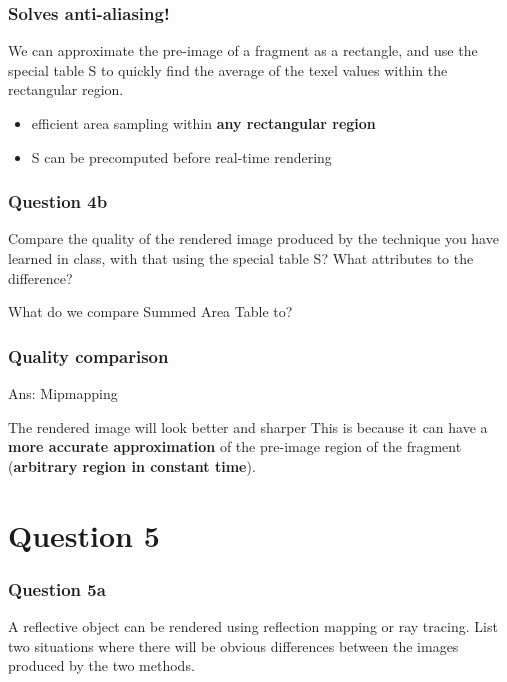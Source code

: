 \documentclass{beamer}
\begin{document}
\begin{frame}
    \frametitle{Solves \textbf{anti-aliasing}!}

    We can approximate the pre-image of a fragment as a rectangle, 
    and use the special table S to quickly find the average of the
    texel values within the rectangular region. 
    
    \begin{itemize}
        \item efficient area sampling within \textbf{any rectangular region}
        \item S can be precomputed before real-time rendering
    \end{itemize}

\end{frame}

\begin{frame}
    \frametitle{Question 4b}

    Compare the quality of the rendered image produced by the technique you have learned in class, 
    with that using the special table S?  What attributes to the difference?

    \begin{tcolorbox}
        What do we compare Summed Area Table to?
    \end{tcolorbox}

\end{frame}

\begin{frame}
    \frametitle{Quality comparison}

    \begin{tcolorbox}
        Ans: Mipmapping
    \end{tcolorbox}

    The rendered image will look better and sharper
    This is because it can have a \textbf{more accurate approximation} of the pre-image
    region of the fragment (\textbf{arbitrary region in constant time}).

\end{frame}

\section{Question 5}

\begin{frame}
    \frametitle{Question 5a}

    A reflective object can be rendered using reflection mapping or ray tracing. List two situations 
    where there will be obvious differences between the images produced by the two methods.
\end{frame}
\end{document}
